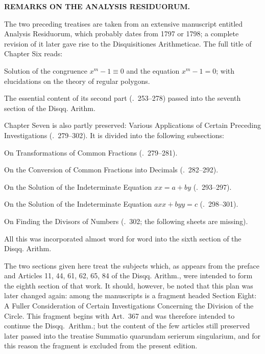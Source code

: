 \clearpage\par\bigskip{}
\begin{center}\large\bfseries REMARKS ON THE ANALYSIS RESIDUORUM.\end{center}
\renewcommand{\BookRunningTitle}{Historical Editor's Remarks on the Analysis Residuorum}

The two preceding treatises are taken from an extensive manuscript entitled Analysis Residuorum, which probably dates from 1797 or 1798; a complete revision of it later gave rise to the Disquisitiones Arithmeticae. The full title of Chapter Six reads:

Solution of the congruence $x^m-1\equiv0$ and the equation $x^m-1=0$; with elucidations on the theory of regular polygons.

The essential content of its second part (\textsection\textsection.\ 253--278) passed into the seventh section of the Disqq. Arithm.

Chapter Seven is also partly preserved: Various Applications of Certain Preceding Investigations (\textsection\textsection.\ 279--302). It is divided into the following subsections:

On Transformations of Common Fractions (\textsection\textsection.\ 279--281).

On the Conversion of Common Fractions into Decimals (\textsection\textsection.\ 282--292).

On the Solution of the Indeterminate Equation $xx=a+by$ (\textsection\textsection.\ 293--297).

On the Solution of the Indeterminate Equation $axx+byy=c$ (\textsection\textsection.\ 298--301).

On Finding the Divisors of Numbers (\textsection.\ 302; the following sheets are missing).

All this was incorporated almost word for word into the sixth section of the Disqq. Arithm.

The two sections given here treat the subjects which, as appears from the preface and Articles 11, 44, 61, 62, 65, 84 of the Disqq. Arithm., were intended to form the eighth section of that work. It should, however, be noted that this plan was later changed again: among the manuscripts is a fragment headed Section Eight: A Fuller Consideration of Certain Investigations Concerning the Division of the Circle. This fragment
begins with Art.\ 367 and was therefore intended to continue the Disqq.\ Arithm.; but the content of the few articles still preserved later passed into the treatise Summatio quarundam serierum singularium, and for this reason the fragment is excluded from the present edition.


